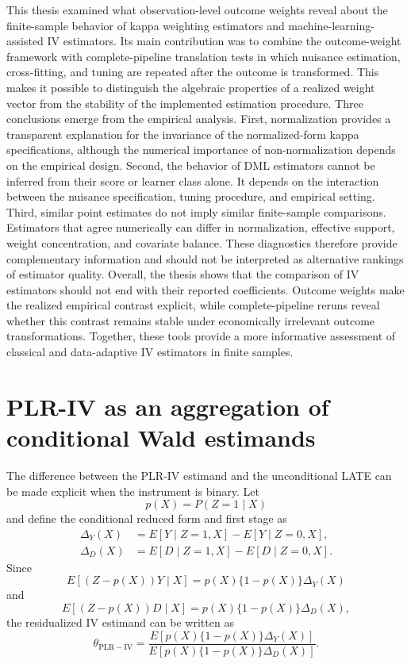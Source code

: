 \documentclass[12pt, a4paper, oneside]{article}
\theoremstyle{plain}
\theoremstyle{definition}
\begin{document}
This thesis examined what observation-level outcome weights reveal about the
finite-sample behavior of kappa weighting estimators and
machine-learning-assisted IV estimators. Its main contribution was to combine
the outcome-weight framework with complete-pipeline translation tests in
which nuisance estimation, cross-fitting, and tuning are repeated after the
outcome is transformed. This makes it possible to distinguish the algebraic
properties of a realized weight vector from the stability of the implemented
estimation procedure.
Three conclusions emerge from the empirical analysis. First, normalization
provides a transparent explanation for the invariance of the normalized-form
kappa specifications, although the numerical importance of non-normalization depends on
the empirical design. Second, the behavior of DML estimators cannot be inferred
from their score or learner class alone. It depends on the interaction between
the nuisance specification, tuning procedure, and empirical setting. Third,
similar point estimates do not imply similar finite-sample comparisons.
Estimators that agree numerically can differ in normalization, effective
support, weight concentration, and covariate balance. These diagnostics
therefore provide complementary information and should not be interpreted as
alternative rankings of estimator quality.
Overall, the thesis shows that the comparison of IV estimators should not end
with their reported coefficients. Outcome weights make the realized empirical
contrast explicit, while complete-pipeline reruns reveal whether this contrast
remains stable under economically irrelevant outcome transformations.
Together, these tools provide a more informative assessment of classical and
data-adaptive IV estimators in finite samples.


\clearpage
\appendix
\renewcommand{\thesection}{\Alph{section}}



\section{PLR-IV as an aggregation of conditional Wald estimands}
\label{app:pliv_late_aggregation}

The difference between the PLR-IV estimand and the unconditional LATE can be
made explicit when the instrument is binary. Let
\[
    p(X)=P(Z=1\mid X)
\]
and define the conditional reduced form and first stage as
\begin{align}
    \Delta_Y(X)
    &=
    E[Y\mid Z=1,X]-E[Y\mid Z=0,X],\\
    \Delta_D(X)
    &=
    E[D\mid Z=1,X]-E[D\mid Z=0,X].
\end{align}
Since
\[
E[(Z-p(X))Y\mid X]
=
p(X)\{1-p(X)\}\Delta_Y(X)
\]
and
\[
E[(Z-p(X))D\mid X]
=
p(X)\{1-p(X)\}\Delta_D(X),
\]
the residualized IV estimand can be written as
\begin{equation}
    \theta_{\mathrm{PLR-IV}}
    =
    \frac{E[p(X)\{1-p(X)\}\Delta_Y(X)]}
         {E[p(X)\{1-p(X)\}\Delta_D(X)]}.
    \label{eq:pliv_conditional_wald_aggregation}
\end{equation}
\end{document}

